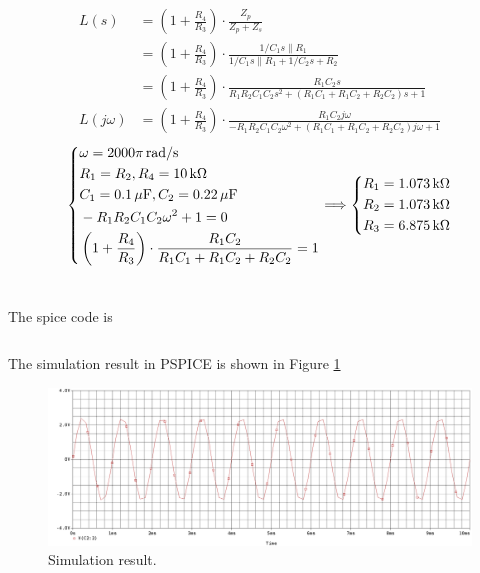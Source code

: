 \documentclass{article}
\newcommand{\unit}[1]{{\rm\,#1}}
\begin{document}
\section{}
\begin{align*}
L(s)&=\left(1+\frac{R_4}{R_3}\right)\cdot\frac{Z_p}{Z_p+Z_s}\\
&=\left(1+\frac{R_4}{R_3}\right)\cdot\frac{1/C_1s\parallel R_1}{1/C_1s\parallel R_1+1/C_2s+R_2}\\
&=\left(1+\frac{R_4}{R_3}\right)\cdot\frac{R_1C_2s}{R_1R_2C_1C_2s^2+(R_1C_1+R_1C_2+R_2C_2)s+1}\\
L(j\omega)&=\left(1+\frac{R_4}{R_3}\right)\cdot\frac{R_1C_2j\omega}{-R_1R_2C_1C_2\omega^2+(R_1C_1+R_1C_2+R_2C_2)j\omega+1}
\end{align*}
$$\left\{\begin{aligned}
&\omega=2000\pi\unit{rad/s}\\
&R_1=R_2,R_4=10\unit{k\Omega}\\
&C_1=0.1\unit{\mu F},C_2=0.22\unit{\mu F}\\
&-R_1R_2C_1C_2\omega^2+1=0\\
&\left(1+\frac{R_4}{R_3}\right)\cdot\frac{R_1C_2}{R_1C_1+R_1C_2+R_2C_2}=1
\end{aligned}\right.\Longrightarrow\left\{\begin{aligned}
R_1&=1.073\unit{k\Omega}\\
R_2&=1.073\unit{k\Omega}\\
R_3&=6.875\unit{k\Omega}
\end{aligned}\right.$$

\section{}

The spice code is
\inputminted[linenos,xleftmargin=1.5em]{v}{p3.cir}

The simulation result in PSPICE is shown in Figure \ref{fig3}

\begin{figure}[!htbp]
\centering
\includegraphics[width=0.95\linewidth]{fig3.png}
\caption{Simulation result.}
\label{fig3}
\end{figure}
\end{document}
